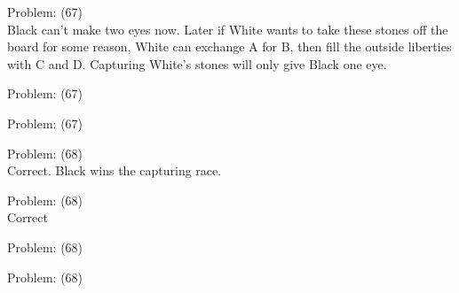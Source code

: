 \documentclass[11pt]{article}
\begin{document}
\begin{minipage}[t]{0.5\textwidth}
  {\centering
  
  Problem: (67)\\
  Black can't make two eyes now. Later if White wants to take these stones off the board for some reason, White can exchange A for B, then fill the outside liberties with C and D. Capturing White's stones will only give Black one eye.\\
  }
\end{minipage}
\begin{minipage}[t]{0.5\textwidth}
  {\centering
  
  Problem: (67)\\
  
  }
\end{minipage}
\begin{minipage}[t]{0.5\textwidth}
  {\centering
  
  Problem: (67)\\
  
  }
\end{minipage}
\begin{minipage}[t]{0.5\textwidth}
  {\centering
  
  Problem: (68)\\
  Correct. Black wins the capturing race.\\
  }
\end{minipage}
\begin{minipage}[t]{0.5\textwidth}
  {\centering
  
  Problem: (68)\\
  Correct\\
  }
\end{minipage}
\begin{minipage}[t]{0.5\textwidth}
  {\centering
  
  Problem: (68)\\
  
  }
\end{minipage}
\begin{minipage}[t]{0.5\textwidth}
  {\centering
  
  Problem: (68)\\
  
  }
\end{minipage}
\end{document}
